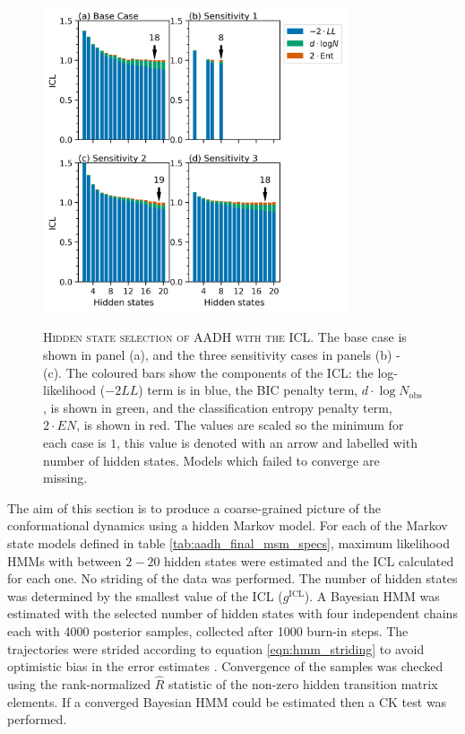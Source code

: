 \begin{figure}
    \centering
    \caption[Hidden state selection of AADH with the ICL]{\textsc{Hidden state selection of AADH with the ICL}. The base case is shown in panel (a), and the three sensitivity cases  in panels (b) - (c).  The coloured bars show the components of the ICL: the log-likelihood ($-2LL$) term is in blue, the BIC penalty term,  $d\cdot\log{N_{\mathrm{obs}}}$, is shown in green, and the classification entropy penalty term, $2\cdot EN$, is shown in red. The values are scaled so the minimum for each case is $1$, this value is denoted with an arrow and labelled  with number of hidden states. Models which failed to converge are missing.}
    \includegraphics[width=0.8\textwidth]{chapters/aadh/figures/aadh_h_state_selection.png}
    \label{fig:aadh_h_selection_results}
\end{figure}

The aim of this section is to produce a coarse-grained picture of the conformational dynamics using a hidden Markov model. For each of the Markov state models defined in table \ref{tab:aadh_final_msm_specs}, maximum likelihood HMMs with between $2 - 20$ hidden states were estimated and the ICL calculated for each one. No striding of the data was performed. The number of hidden states was determined by the smallest value of the ICL ($g^{\mathrm{ICL}}$). A Bayesian HMM was estimated with the selected number of hidden states with four independent chains each with \num{4000} posterior samples, collected after \num{1000} burn-in steps. The trajectories were strided according to equation \ref{eqn:hmm_striding} to avoid optimistic bias in the error estimates \cite{trendelkamp-schroerEstimationUncertaintyReversible2015b}. Convergence of the samples was checked using the rank-normalized $\hat{R}$ statistic \cite{vehtariRanknormalizationFoldingLocalization2020} of the non-zero hidden transition matrix elements. If a converged Bayesian HMM could be estimated then a CK test was performed. 

